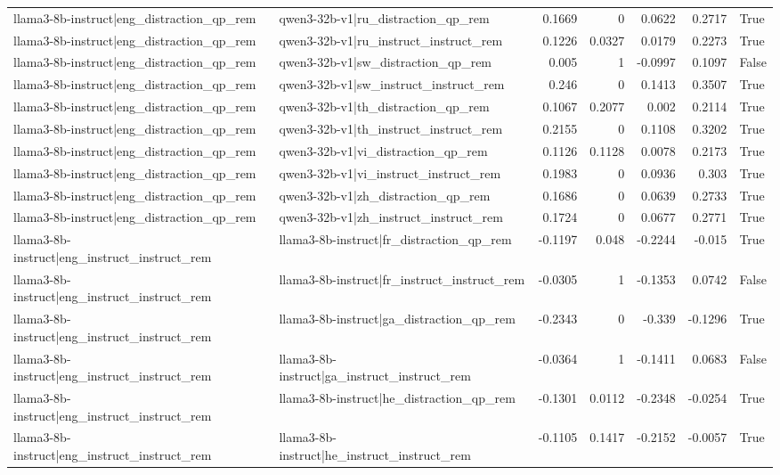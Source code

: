 \begin{table}
\begin{tabular}{l l r r r r l}
llama3-8b-instruct|eng_distraction_qp_rem & qwen3-32b-v1|ru_distraction_qp_rem & 0.1669 & 0 & 0.0622 & 0.2717 & True \\
llama3-8b-instruct|eng_distraction_qp_rem & qwen3-32b-v1|ru_instruct_instruct_rem & 0.1226 & 0.0327 & 0.0179 & 0.2273 & True \\
llama3-8b-instruct|eng_distraction_qp_rem & qwen3-32b-v1|sw_distraction_qp_rem & 0.005 & 1 & -0.0997 & 0.1097 & False \\
llama3-8b-instruct|eng_distraction_qp_rem & qwen3-32b-v1|sw_instruct_instruct_rem & 0.246 & 0 & 0.1413 & 0.3507 & True \\
llama3-8b-instruct|eng_distraction_qp_rem & qwen3-32b-v1|th_distraction_qp_rem & 0.1067 & 0.2077 & 0.002 & 0.2114 & True \\
llama3-8b-instruct|eng_distraction_qp_rem & qwen3-32b-v1|th_instruct_instruct_rem & 0.2155 & 0 & 0.1108 & 0.3202 & True \\
llama3-8b-instruct|eng_distraction_qp_rem & qwen3-32b-v1|vi_distraction_qp_rem & 0.1126 & 0.1128 & 0.0078 & 0.2173 & True \\
llama3-8b-instruct|eng_distraction_qp_rem & qwen3-32b-v1|vi_instruct_instruct_rem & 0.1983 & 0 & 0.0936 & 0.303 & True \\
llama3-8b-instruct|eng_distraction_qp_rem & qwen3-32b-v1|zh_distraction_qp_rem & 0.1686 & 0 & 0.0639 & 0.2733 & True \\
llama3-8b-instruct|eng_distraction_qp_rem & qwen3-32b-v1|zh_instruct_instruct_rem & 0.1724 & 0 & 0.0677 & 0.2771 & True \\
llama3-8b-instruct|eng_instruct_instruct_rem & llama3-8b-instruct|fr_distraction_qp_rem & -0.1197 & 0.048 & -0.2244 & -0.015 & True \\
llama3-8b-instruct|eng_instruct_instruct_rem & llama3-8b-instruct|fr_instruct_instruct_rem & -0.0305 & 1 & -0.1353 & 0.0742 & False \\
llama3-8b-instruct|eng_instruct_instruct_rem & llama3-8b-instruct|ga_distraction_qp_rem & -0.2343 & 0 & -0.339 & -0.1296 & True \\
llama3-8b-instruct|eng_instruct_instruct_rem & llama3-8b-instruct|ga_instruct_instruct_rem & -0.0364 & 1 & -0.1411 & 0.0683 & False \\
llama3-8b-instruct|eng_instruct_instruct_rem & llama3-8b-instruct|he_distraction_qp_rem & -0.1301 & 0.0112 & -0.2348 & -0.0254 & True \\
llama3-8b-instruct|eng_instruct_instruct_rem & llama3-8b-instruct|he_instruct_instruct_rem & -0.1105 & 0.1417 & -0.2152 & -0.0057 & True \\

\end{tabular}
\end{table}

